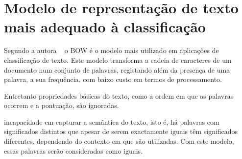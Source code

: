 \section{Modelo de representação de texto mais adequado à classificação}

Segundo a autora ~\cite{alexandra_alves:2010} o BOW é o modelo mais utilizado em aplicações de classificação de texto. Este modelo transforma a cadeia de caracteres de um documento num conjunto de palavras, registando além da presença de uma palavra, a sua frequência. com baixo custo em termos de processamento.

Entretanto propriedades básicas do texto, como a ordem em que as palavras ocorrem e a pontuação, são ignoradas.

incapacidade em capturar a semântica do texto,
isto é, há palavras com significados distintos que apesar de serem exactamente iguais têm
significados diferentes, dependendo do contexto em que são utilizadas. Com este modelo,
essas palavras serão consideradas como iguais.









